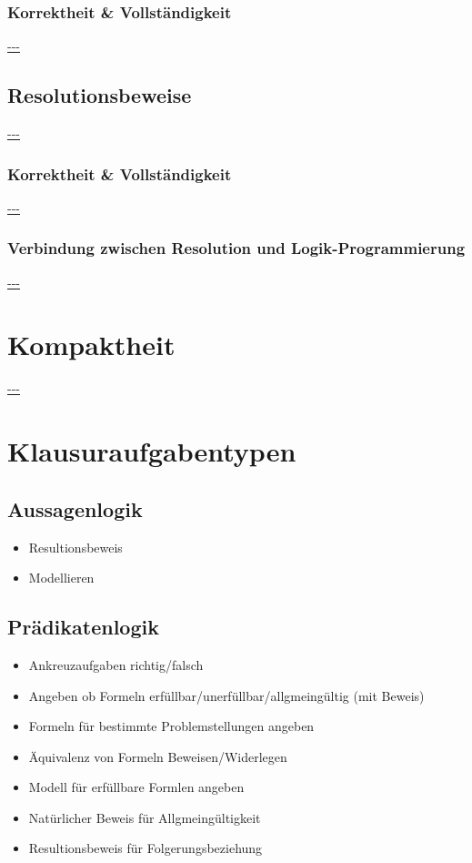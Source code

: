 \documentclass{article}
\begin{document}
    \subsubsection{Korrektheit \& Vollständigkeit}
    \url{---}\\

    \subsection{Resolutionsbeweise}
    \url{---}\\

    \subsubsection{Korrektheit \& Vollständigkeit}
    \url{---}\\

    \subsubsection{Verbindung zwischen Resolution und Logik-Programmierung}
    \url{---}\\

    \section{Kompaktheit}
    \url{---}\\

    \section{Klausuraufgabentypen}

    \subsection{Aussagenlogik}
    \begin{itemize}
        \item Resultionsbeweis
        \item Modellieren
    \end{itemize}

    \subsection{Prädikatenlogik}
    \begin{itemize}
        \item Ankreuzaufgaben richtig/falsch
        \item Angeben ob Formeln erfüllbar/unerfüllbar/allgmeingültig (mit Beweis)
        \item Formeln für bestimmte Problemstellungen angeben
        \item Äquivalenz von Formeln Beweisen/Widerlegen
        \item Modell für erfüllbare Formlen angeben
        \item Natürlicher Beweis für Allgmeingültigkeit
        \item Resultionsbeweis für Folgerungsbeziehung
    \end{itemize}
\end{document}

